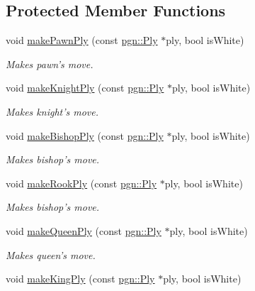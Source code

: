 \subsection*{Protected Member Functions}
\begin{DoxyCompactItemize}
\item 
void \hyperlink{classChEngn_1_1Engine_af414502f81e9abda2d41bd16e3e18ef0}{makePawnPly} (const \hyperlink{classpgn_1_1Ply}{pgn::Ply} $\ast$ply, bool isWhite)
\begin{DoxyCompactList}\small\item\em Makes pawn's move. \item\end{DoxyCompactList}\item 
void \hyperlink{classChEngn_1_1Engine_a9b7fdcf2cf7718e5e602ce6e3be3d4c8}{makeKnightPly} (const \hyperlink{classpgn_1_1Ply}{pgn::Ply} $\ast$ply, bool isWhite)
\begin{DoxyCompactList}\small\item\em Makes knight's move. \item\end{DoxyCompactList}\item 
void \hyperlink{classChEngn_1_1Engine_ae090fc9d1724d63d8af41e5a7c4f1d3d}{makeBishopPly} (const \hyperlink{classpgn_1_1Ply}{pgn::Ply} $\ast$ply, bool isWhite)
\begin{DoxyCompactList}\small\item\em Makes bishop's move. \item\end{DoxyCompactList}\item 
void \hyperlink{classChEngn_1_1Engine_a6ed93f939bbf1cc780a1b2f364068eaa}{makeRookPly} (const \hyperlink{classpgn_1_1Ply}{pgn::Ply} $\ast$ply, bool isWhite)
\begin{DoxyCompactList}\small\item\em Makes bishop's move. \item\end{DoxyCompactList}\item 
void \hyperlink{classChEngn_1_1Engine_a472c2c8efd42dc93027b395df64a71d2}{makeQueenPly} (const \hyperlink{classpgn_1_1Ply}{pgn::Ply} $\ast$ply, bool isWhite)
\begin{DoxyCompactList}\small\item\em Makes queen's move. \item\end{DoxyCompactList}\item 
void \hyperlink{classChEngn_1_1Engine_a6512882396e670361c5b2289e0c85517}{makeKingPly} (const \hyperlink{classpgn_1_1Ply}{pgn::Ply} $\ast$ply, bool isWhite)

\end{DoxyCompactItemize}
